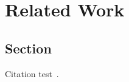 \chapter{Related Work}\label{chapter:related_work}

\section{Section}
Citation test~\parencite{latex}.


